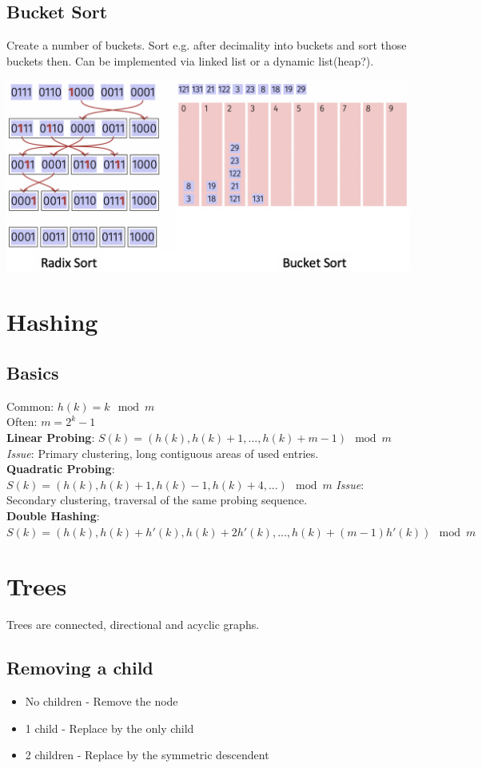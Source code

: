 \documentclass[10pt,landscape,a4paper, table]{extarticle}
\begin{document}
\begin{multicols*}{3}
\subsection{Bucket Sort}
Create a number of buckets. Sort e.g. after decimality into buckets and sort those buckets then. Can be implemented via linked list or a dynamic list(heap?).

{
\hspace{1cm}\includegraphics[width = 0.8\linewidth]{img/Bucket.png}
}


\section{Hashing}

\subsection{Basics}
Common: $h(k) = k \mod m$\\
Often: $m = 2^k - 1$\\

\textbf{Linear Probing}: $S(k) = (h(k), h(k) + 1 ,..., h(k) + m - 1)\mod m$
\textit{Issue}: Primary clustering, long contiguous areas of used entries.\\ 
\textbf{Quadratic Probing}: $S(k) = (h(k), h(k) + 1, h(k) -1, h(k) + 4, ...)\mod m$ \textit{Issue}: Secondary clustering, traversal of the same probing sequence.\\ 
\textbf{Double Hashing}: $S(k) = (h(k),h(k)+h'(k),h(k)+2h'(k),...,h(k)+(m-1)h'(k))\mod m$

\section{Trees}
Trees are connected, directional and acyclic graphs.

\subsection{Removing a child}
\begin{itemize}
    \item No children - Remove the node
    \item 1 child - Replace by the only child
    \item 2 children - Replace by the symmetric descendent
\end{itemize}


\end{multicols*}
\end{document}
